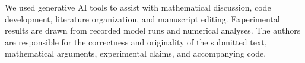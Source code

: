 We used generative AI tools to assist with mathematical discussion, code development, literature organization, and manuscript editing. Experimental results are drawn from recorded model runs and numerical analyses. The authors are responsible for the correctness and originality of the submitted text, mathematical arguments, experimental claims, and accompanying code.
